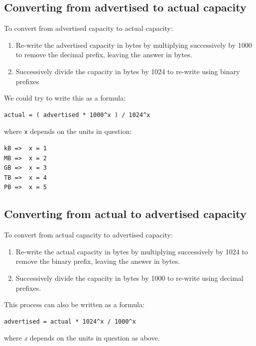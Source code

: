\subsection{Converting from advertised to actual
capacity}\label{converting-from-advertised-to-actual-capacity}

To convert from advertised capacity to actual capacity:

\begin{enumerate}
\def\labelenumi{\arabic{enumi}.}
\item
  Re-write the advertised capacity in bytes by multiplying successively
  by 1000 to remove the decimal prefix, leaving the answer in bytes.
\item
  Successively divide the capacity in bytes by 1024 to re-write using
  binary prefixes
\end{enumerate}

We could try to write this as a formula:

\begin{verbatim}
actual = ( advertised * 1000^x ) / 1024^x
\end{verbatim}

where \texttt{x} depends on the units in question:

\begin{verbatim}
kB =>  x = 1
MB =>  x = 2
GB =>  x = 3
TB =>  x = 4
PB =>  x = 5
\end{verbatim}

\subsection{Converting from actual to advertised
capacity}\label{converting-from-actual-to-advertised-capacity}

To convert from actual capacity to advertised capacity:

\begin{enumerate}
\def\labelenumi{\arabic{enumi}.}
\item
  Re-write the actual capacity in bytes by multiplying successively by
  1024 to remove the binary prefix, leaving the answer in bytes.
\item
  Successively divide the capacity in bytes by 1000 to re-write using
  decimal prefixes.
\end{enumerate}

This process can also be written as a formula:

\begin{verbatim}
advertised = actual * 1024^x / 1000^x
\end{verbatim}

where {\emph{x}} depends on the units in question as above.
